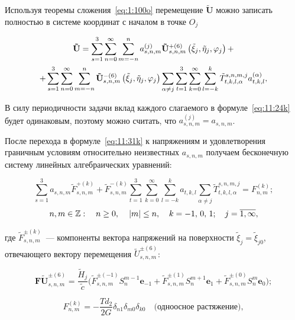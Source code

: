 Используя теоремы сложения~\eqref{eq:1:100o} перемещение $\mathbf{\tilde U}$ можно записать полностью в системе координат с началом в точке $O_j$

\begin{multline}
{\bf{\tilde U}} = \sum\limits_{s = 1}^3 {\sum\limits_{n = 0}^\infty  {\sum\limits_{m =  - n }^{n } {a_{s,n,m}^{(j)}} } } {\bf{\tilde U}}_{s,n,m}^{ +(6)}\left( {{\tilde\xi_j},{\tilde\eta _j},{\varphi _j}} \right) + \\
+ \sum\limits_{s=1}^3\sum\limits_{n = 0}^\infty\sum\limits_{m =  - n }^{n }{\bf{\tilde U}}_{s,n,m}^{ - (6)}\left( {{\tilde\xi_j},{\tilde\eta _j},{\varphi _j}} \right)\sum\limits_{\alpha  \ne j}\sum\limits_{t=1}^3\sum\limits_{k = 0}^\infty\mathop \sum \limits_{l =  - k}^{k}\tilde T_{t,k,l,\alpha}^{s,n,m,j}a_{t,k,l}^{(\alpha)},
\label{eq:11:31k}
\end{multline}

В силу периодичности задачи вклад каждого слагаемого в формуле~\eqref{eq:11:24k} будет одинаковым, поэтому можно считать, что $a_{s,n,m}^{(j)}=a_{s,n,m}$.

После перехода в формуле~\eqref{eq:11:31k} к напряжениям и удовлетворения граничным условиям относительно неизвестных $a_{s,n,m}$ получаем бесконечную систему линейных алгебраических уравнений:

\begin{equation}
\sum\limits_{s=1}^3 a_{s,n,m}\tilde F_{s,n,m}^{+(k)}+\tilde F_{s,n,m}^{-(k)}\sum\limits_{t=1}^3\sum\limits_{k=0}^\infty\sum\limits_{l=-k}^k a_{t,k,l}\sum\limits_{\alpha\neq j}\tilde T_{t,k,l,\alpha}^{s,n,m,j}=F_{n,m}^{(k)};
\label{eq:11:32k}
\end{equation}
$$
n,m \in\mathbb{Z}:\quad n \ge 0,{\mkern 1mu} \quad {\kern 1pt} |m| \le n,\quad {\mkern 1mu} k =  - 1,{\mkern 1mu} {\kern 1pt} 0,{\mkern 1mu} {\kern 1pt} 1;\;\;\;{\mkern 1mu} {\kern 1pt} j = \overline {1,\infty},
$$

\noindent где $\tilde F_{s,n,m}^{\pm(k)}$~--- компоненты вектора напряжений на поверхности $\tilde\xi_j=\tilde\xi_{j0}$, отвечающего вектору перемещения $\tilde U_{s,n,m}^{\pm(6)}$:

$$
\mathbf{F\tilde U}_{s,n,m}^{\pm(6)}=\frac{\tilde H_j}{\tilde c}\bigg(\tilde F_{s,n,m}^{\pm(-1)}S_n^{m-1}\mathbf{e}_{-1}+\tilde F_{s,n,m}^{\pm(1)}S_n^{m+1}\mathbf{e}_1+\tilde F_{s,n,m}^{\pm(0)}S_n^m\mathbf{e}_0\bigg);
$$

\begin{equation*}
F_{n,m}^{(k)} =  -\frac{Td_2}{2G}{\delta _{n1}}{\delta _{m0}}{\delta _{k0}}\quad\text{(одноосное растяжение)},
\end{equation*}

